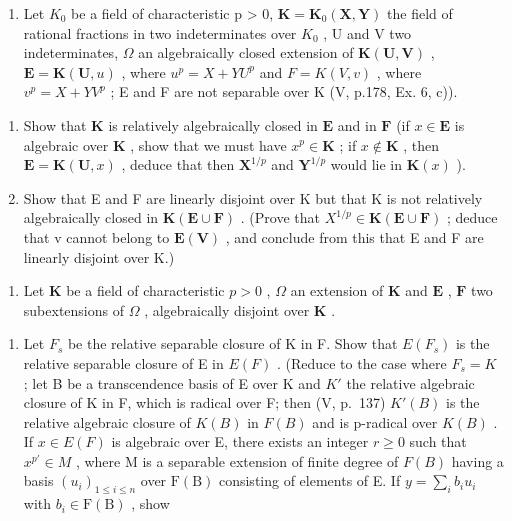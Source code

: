 \BourbakiExerciseGroup

\begin{enumerate}
\def\labelenumi{\arabic{enumi})}
\tightlist
\item
  Let \(K_{0}\) be a field of characteristic p \textgreater{} 0, \(\mathbf{K} = \mathbf{K}_{0}(\mathbf{X}, \mathbf{Y})\) the field of rational fractions in two indeterminates over \(K_{0}\) , U and V two indeterminates, \(\Omega\) an algebraically closed extension of \(\mathbf{K}(\mathbf{U}, \mathbf{V})\) , \(\mathbf{E} = \mathbf{K}(\mathbf{U}, u)\) , where \(u^{p} = X + YU^{p}\) and \(F = K(V, v)\) , where \(v^{p} = X + YV^{p}\) ; E and F are not separable over K (V, p.178, Ex. 6, c)).
\end{enumerate}

\begin{enumerate}
\def\labelenumi{\alph{enumi})}
\item
  Show that \(\mathbf{K}\) is relatively algebraically closed in \(\mathbf{E}\) and in \(\mathbf{F}\) (if \(x \in \mathbf{E}\) is algebraic over \(\mathbf{K}\) , show that we must have \(x^p \in \mathbf{K}\) ; if \(x \notin \mathbf{K}\) , then \(\mathbf{E} = \mathbf{K}(\mathbf{U}, x)\) , deduce that then \(\mathbf{X}^{1/p}\) and \(\mathbf{Y}^{1/p}\) would lie in \(\mathbf{K}(x)\) ).
\item
  Show that E and F are linearly disjoint over K but that K is not relatively algebraically closed in \(\mathbf{K}(\mathbf{E} \cup \mathbf{F})\) . (Prove that \(X^{1/p} \in \mathbf{K}(\mathbf{E} \cup \mathbf{F})\) ; deduce that v cannot belong to \(\mathbf{E}(\mathbf{V})\) , and conclude from this that E and F are linearly disjoint over K.)
\end{enumerate}

\begin{enumerate}
\def\labelenumi{\arabic{enumi})}
\setcounter{enumi}{1}
\tightlist
\item
  Let \(\mathbf{K}\) be a field of characteristic \(p > 0\) , \(\Omega\) an extension of \(\mathbf{K}\) and \(\mathbf{E}\) , \(\mathbf{F}\) two subextensions of \(\Omega\) , algebraically disjoint over \(\mathbf{K}\) .
\end{enumerate}

\begin{enumerate}
\def\labelenumi{\alph{enumi})}
\tightlist
\item
  Let \(F_{s}\) be the relative separable closure of K in F. Show that \(E(F_{s})\) is the relative separable closure of E in \(E(F)\) . (Reduce to the case where \(F_{s}=K\) ; let B be a transcendence basis of E over K and \(K'\) the relative algebraic closure of K in F, which is radical over F; then (V, p.~137) \(K'(B)\) is the relative algebraic closure of \(K(B)\) in \(F(B)\) and is p-radical over \(K(B)\) . If \(x\in E(F)\) is algebraic over E, there exists an integer \(r\geqslant0\) such that \(x^{p'}\in M\) , where M is a separable extension of finite degree of \(F(B)\) having a basis \((u_{i})_{1\leqslant i\leqslant n}\) over \(\mathrm{F(B)}\) consisting of elements of E. If \(y = \sum_{i}b_{i}u_{i}\) with \(b_{i}\in \mathrm{F(B)}\) , show
\end{enumerate}

